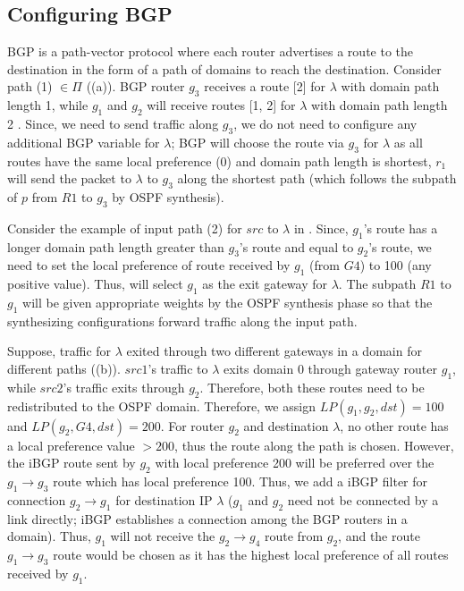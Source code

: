 \subsection{Configuring BGP}
BGP is a path-vector protocol where each router 
advertises a route to the destination in the form 
of a path of domains to reach the destination. 
Consider path (1) $\in \Pi$ ((a)).
BGP router $g_3$ receives a route [2] for $\lambda$ with domain path length 1, 
while $g_1$ and $g_2$ will receive routes [1, 2] for $\lambda$ with 
domain path length 2 . Since, we need to send traffic along
$g_3$, we do not need to configure any additional BGP variable for $\lambda$;
BGP will choose the route via $g_3$ for $\lambda$ 
 as all routes have
the same local preference (0) and domain path length is shortest,
$r_1$ will
send the packet to $\lambda$ to $g_3$ along the shortest path (which 
follows the subpath of $p$ from $R1$ to $g_3$ by OSPF synthesis). 

Consider the example of input path (2) for $src$ to $\lambda$ 
in . Since, $g_1$'s route has a longer domain 
path length greater than $g_3$'s route and equal to $g_2$'s route,
we need to set the local preference of route received by $g_1$ 
(from $G4$) to 100 (any positive value). Thus,  
will select $g_1$ as the exit gateway for $\lambda$. The subpath
$R1$ to $g_1$ will be given appropriate weights by the OSPF
synthesis phase so that the synthesizing configurations 
forward traffic along the input path. 

Suppose, traffic for $\lambda$ exited through two different
gateways in a domain for different paths ((b)).
$src1$'s traffic to $\lambda$ exits domain 0 through 
gateway router $g_1$, while $src2$'s traffic exits 
through $g_2$. Therefore, both these routes need to be 
redistributed to the OSPF domain. Therefore, we assign
$LP(g_1,g_2,dst) = 100$ and $LP(g_2,G4,dst) = 200$. For 
router $g_2$ and destination $\lambda$, 
no other route has a local preference value $>200$, thus 
the route along the path is chosen. However, the iBGP route
sent by $g_2$ with local preference 200 will be preferred over
the $g_1\rightarrow g_3$ route which has local preference 100.
Thus, we add a iBGP filter for connection $g_2 \rightarrow g_1$ for
destination IP $\lambda$ ($g_1$ and $g_2$ need not be connected by a 
link directly; iBGP establishes a connection among the 
BGP routers in a domain). Thus, $g_1$ will not receive the
$g_2 \rightarrow g_4$ route from $g_2$, and the route $g_1 \rightarrow
g_3$ route would be chosen as it has the highest local preference
of all routes received by $g_1$. 

